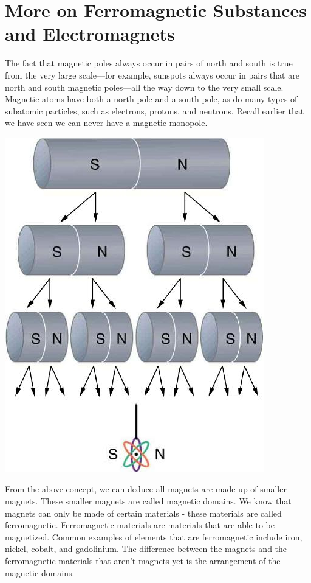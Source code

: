 \documentclass[9pt]{exam}
\begin{document}
	\section*{More on Ferromagnetic Substances and Electromagnets}
	The fact that magnetic poles always occur in pairs of north and south is true from the very large scale—for example, sunspots always occur in pairs that are north and south magnetic poles—all the way down to the very small scale. Magnetic atoms have both a north pole and a south pole, as do many types of subatomic particles, such as electrons, protons, and neutrons. Recall earlier that we have seen we can never have a magnetic monopole.
	\begin{center}
		\includegraphics[scale=0.3]{magnets_divided}
	\end{center}
	From the above concept, we can deduce all magnets are made up of smaller magnets. These smaller magnets are called magnetic domains. We know that magnets can only be made of certain materials - these materials are called  ferromagnetic. Ferromagnetic materials are materials that are able to be magnetized. Common examples of elements that are ferromagnetic include iron, nickel, cobalt, and gadolinium. The difference between the magnets and the ferromagnetic materials that aren't magnets yet is the arrangement of the magnetic domains.
\end{document}
